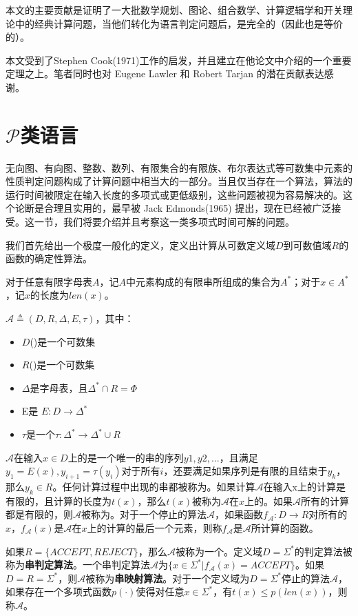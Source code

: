 \documentclass[twocolumn]{article}
\theoremstyle{nonumberplain}%
\begin{document}
\begin{CJK}{UTF8}{gbsn}
    本文的主要贡献是证明了一大批数学规划、图论、组合数学、计算逻辑学和开关理论中的经典计算问题，当他们转化为语言判定问题后，是完全的（因此也是等价的）。

    本文受到了Stephen Cook(1971)工作的启发，并且建立在他论文中介绍的一个重要定理之上。笔者同时也对 Eugene Lawler 和 Robert Tarjan 的潜在贡献表达感谢。

\section{$\mathcal{P}$类语言}
    无向图、有向图、整数、数列、有限集合的有限族、布尔表达式等可数集中元素的性质判定问题构成了计算问题中相当大的一部分。当且仅当存在一个算法，算法的运行时间被限定在输入长度的多项式或更低级别，这些问题被视为容易解决的。这个论断是合理且实用的，最早被 Jack Edmonds(1965) 提出，现在已经被广泛接受。这一节，我们将要介绍并且考察这一类多项式时间可解的问题。

    我们首先给出一个极度一般化的定义，定义出计算从可数定义域$D$到可数值域$R$的函数的确定性算法。

    对于任意有限字母表$A$，记$A$中元素构成的有限串所组成的集合为$A^*$；对于$x\in A^*$，记$x$的长度为$len(x)$。

    {}$\mathcal{A}\triangleq(D,R,\Delta,E,\tau)$，其中：
    \begin{itemize}
    \item $D$({})是一个可数集
    \item $R$({})是一个可数集
    \item $\Delta$是字母表，且$\Delta^*\cap R=\Phi$
    \item E是{} $E:D\rightarrow\Delta^*$
    \item $\tau$是一个{ }$\tau:\Delta^*\rightarrow\Delta^*\cup R$
    \end{itemize}

    $\mathcal{A}$在输入$x\in D$上的{}是一个唯一的串的序列$y1,y2,...$，且满足$y_1=E(x),y_{i+1}=\tau(y_i)$对于所有$i$，还要满足如果序列是有限的且结束于$y_k$，那么$y_k\in R$。任何计算过程中出现的串都被称为{}。如果计算$\mathcal{A}$在输入x上的计算是有限的，且计算的长度为$t(x)$，那么$t(x)$被称为$\mathcal{A}$在$x$上的{}。如果$\mathcal{A}$所有的计算都是有限的，则$\mathcal{A}$被称为{}。对于一个停止的算法$\mathcal{A}$，如果函数$f_\mathcal{A}:D\rightarrow R$对所有的$x$，$f_\mathcal{A}(x)$是$\mathcal{A}$在$x$上的计算的最后一个元素，则称$f_\mathcal{A}$是$\mathcal{A}$所计算的函数。

    如果$R=\{ACCEPT,REJECT\}$，那么$\mathcal{A}$被称为一个{}。定义域$D=\Sigma^*$的判定算法被称为{\bf 串判定算法}。一个串判定算法$\mathcal{A}${}为$\{x\in\Sigma^*|f_\mathcal{A}(x)=ACCEPT\}$。如果$D=R=\Sigma^*$，则$\mathcal{A}$被称为{\bf 串映射算法}。对于一个定义域为$D=\Sigma^*$停止的算法$\mathcal{A}$，如果存在一个多项式函数$p(\cdot)$使得对任意$x\in\Sigma^*$，有$t(x)\le p(len(x))$，则称$\mathcal{A}${}。


\end{CJK}
\end{document}
